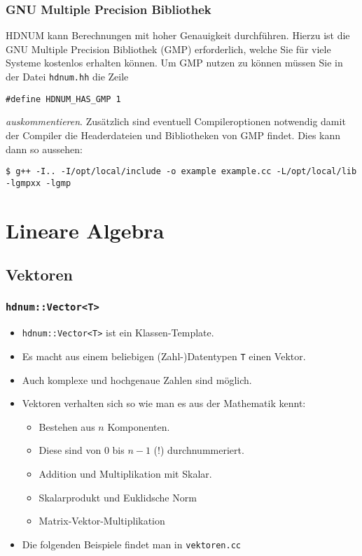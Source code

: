 \documentclass[a4paper,11pt]{article}
\theoremstyle{definition}
\begin{document}
\subsubsection*{GNU Multiple Precision Bibliothek}

HDNUM kann Berechnungen mit hoher Genauigkeit durchführen. Hierzu ist die GNU Multiple Precision
Bibliothek (GMP) erforderlich, 
welche Sie für viele Systeme kostenlos erhalten können. Um GMP nutzen zu können müssen 
Sie in der Datei \lstinline{hdnum.hh} die Zeile
\begin{lstlisting}[basicstyle=\ttfamily\small,frame=single]
#define HDNUM_HAS_GMP 1
\end{lstlisting}
\textit{auskommentieren}. Zusätzlich sind eventuell Compileroptionen notwendig damit der Compiler
die Headerdateien und Bibliotheken von GMP findet. Dies kann dann so aussehen:
\begin{lstlisting}[basicstyle=\ttfamily\footnotesize,frame=single]
$ g++ -I.. -I/opt/local/include -o example example.cc -L/opt/local/lib -lgmpxx -lgmp
\end{lstlisting}

\section{Lineare Algebra}

\subsection{Vektoren}

\begin{frame}[fragile]
\frametitle{\lstinline{hdnum::Vector<T>}}
\begin{itemize}
\item \lstinline{hdnum::Vector<T>} ist ein Klassen-Template.
\item Es macht aus einem beliebigen (Zahl-)Datentypen \lstinline{T}
  einen Vektor.
\item Auch komplexe und hochgenaue Zahlen sind möglich.
\item Vektoren verhalten sich so wie man es aus der Mathematik kennt:
\begin{itemize}
\item Bestehen aus $n$ Komponenten.
\item Diese sind von $0$ bis $n-1$ (!) durchnummeriert.
\item Addition und Multiplikation mit Skalar.
\item Skalarprodukt und Euklidsche Norm
\item Matrix-Vektor-Multiplikation
\end{itemize}
\item Die folgenden Beispiele findet man in \lstinline{vektoren.cc}
\end{itemize}
\end{frame}
\end{document}
